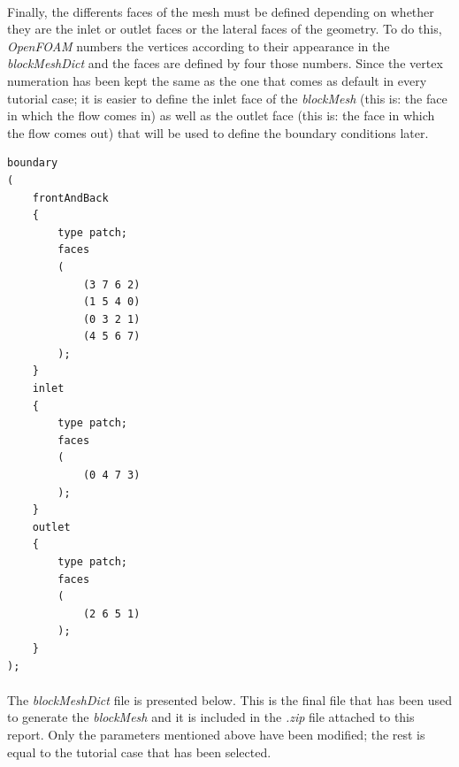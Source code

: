\paragraph{}Finally, the differents faces of the mesh must be defined depending on whether they are the inlet or outlet faces or the lateral faces of the geometry. To do this, \textit{OpenFOAM} numbers the vertices according to their appearance in the \textit{blockMeshDict} and the faces are defined by four those numbers. Since the vertex numeration has been kept the same as the one that comes as default in every tutorial case; it is easier to define the inlet face of the \textit{blockMesh} (this is: the face in which the flow comes in) as well as the outlet face (this is: the face in which the flow comes out) that will be used to define the boundary conditions later.

\begin{footnotesize}
\begin{verbatim}
boundary
(
    frontAndBack
    {
        type patch;
        faces
        (
            (3 7 6 2)
            (1 5 4 0)
            (0 3 2 1)
            (4 5 6 7)
        );
    }
    inlet
    {
        type patch;
        faces
        (
            (0 4 7 3)
        );
    }
    outlet
    {
        type patch;
        faces
        (
            (2 6 5 1)
        );
    }
);
\end{verbatim}
\end{footnotesize}

\paragraph{}The \textit{blockMeshDict} file is presented below. This is the final file that has been used to generate the \textit{blockMesh} and it is included in the \textit{.zip} file attached to this report. Only the parameters mentioned above have been modified; the rest is equal to the tutorial case that has been selected.

